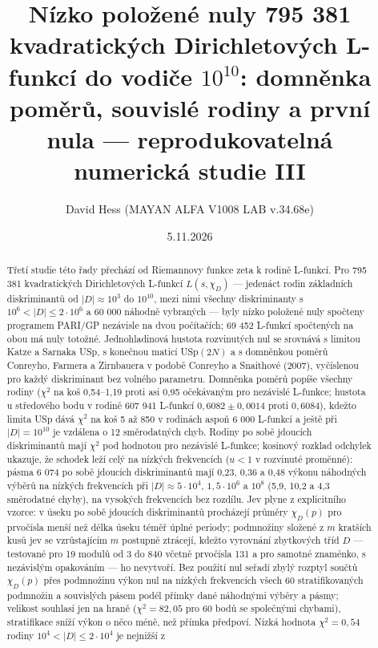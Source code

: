 \documentclass[
  10pt,
]{article}
\title{Nízko položené nuly 795 381 kvadratických Dirichletových L-funkcí
do vodiče \(10^{10}\): domněnka poměrů, souvislé rodiny a první nula ---
reprodukovatelná numerická studie III}
\author{David Hess (MAYAN ALFA V1008 LAB v.34.68e)}
\date{5.11.2026}
\begin{document}
\maketitle
\begin{abstract}
Třetí studie této řady přechází od Riemannovy funkce zeta k rodině
L-funkcí. Pro 795 381 kvadratických Dirichletových L-funkcí
\(L(s, \chi_D)\) --- jedenáct rodin základních diskriminantů od
\(|D| \approx 10^3\) do \(10^{10}\), mezi nimi všechny diskriminanty s
\(10^6 < |D| \le 2\cdot10^6\) a 60 000 náhodně vybraných --- byly nízko
položené nuly spočteny programem PARI/GP nezávisle na dvou počítačích;
69 452 L-funkcí spočtených na obou má nuly totožné. Jednohladinová
hustota rozvinutých nul se srovnává s limitou Katze a Sarnaka USp, s
konečnou maticí USp\((2N)\) a s domněnkou poměrů Conreyho, Farmera a
Zirnbauera v podobě Conreyho a Snaithové (2007), vyčíslenou pro každý
diskriminant bez volného parametru. Domněnka poměrů popíše všechny
rodiny (\(\chi^2\) na koš 0,54--1,19 proti asi 0,95 očekávaným pro
nezávislé L-funkce; hustota u středového bodu v rodině 607 941 L-funkcí
\(0{,}6082 \pm 0{,}0014\) proti \(0{,}6084\)), kdežto limita USp dává
\(\chi^2\) na koš 5 až 850 v rodinách aspoň 6 000 L-funkcí a ještě při
\(|D| = 10^{10}\) je vzdálena o 12 směrodatných chyb. Rodiny po sobě
jdoucích diskriminantů mají \(\chi^2\) pod hodnotou pro nezávislé
L-funkce; kosinový rozklad odchylek ukazuje, že schodek leží celý na
nízkých frekvencích (\(u < 1\) v rozvinuté proměnné): pásma 6 074 po
sobě jdoucích diskriminantů mají 0,23, 0,36 a 0,48 výkonu náhodných
výběrů na nízkých frekvencích při \(|D| \approx 5\cdot10^4\),
\(1{,}5\cdot10^6\) a \(10^8\) (5,9, 10,2 a 4,3 směrodatné chyby), na
vysokých frekvencích bez rozdílu. Jev plyne z explicitního vzorce: v
úseku po sobě jdoucích diskriminantů procházejí průměry \(\chi_D(p)\)
pro prvočísla menší než délka úseku téměř úplné periody; podmnožiny
složené z \(m\) kratších kusů jev se vzrůstajícím \(m\) postupně
ztrácejí, kdežto vyrovnání zbytkových tříd \(D\) --- testované pro 19
modulů od 3 do 840 včetně prvočísla 131 a pro samotné znaménko, s
nezávislým opakováním --- ho nevytvoří. Bez použití nul seřadí zbylý
rozptyl součtů \(\chi_D(p)\) přes podmnožinu výkon nul na nízkých
frekvencích všech 60 stratifikovaných podmnožin a souvislých pásem podél
přímky dané náhodnými výběry a pásmy; velikost souhlasí jen na hraně
(\(\chi^2 = 82{,}05\) pro 60 bodů se společnými chybami), stratifikace
sníží výkon o něco méně, než přímka předpoví. Nízká hodnota
\(\chi^2 = 0{,}54\) rodiny \(10^4 < |D| \le 2\cdot10^4\) je nejnižší z

\end{abstract}
\end{document}
